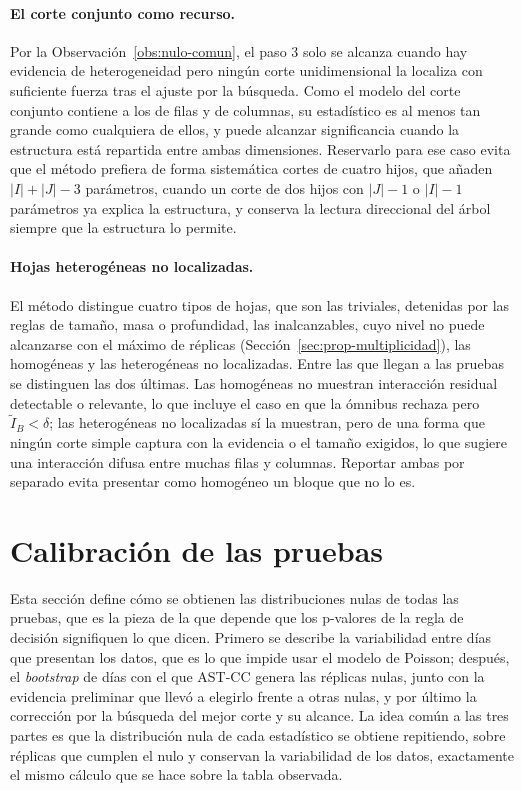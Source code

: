 \paragraph{El corte conjunto como recurso.} Por la
Observación~\ref{obs:nulo-comun}, el paso 3 solo se alcanza cuando hay
evidencia de heterogeneidad pero ningún corte unidimensional la localiza con
suficiente fuerza tras el ajuste por la búsqueda. Como el modelo del corte
conjunto contiene a los de filas y de columnas, su estadístico es al menos tan
grande como cualquiera de ellos, y puede alcanzar significancia cuando la
estructura está repartida entre ambas dimensiones. Reservarlo para ese caso
evita que el método prefiera de forma sistemática cortes de cuatro hijos, que
añaden $|I|+|J|-3$ parámetros, cuando un corte de dos hijos con $|J|-1$ o
$|I|-1$ parámetros ya explica la estructura, y conserva la lectura direccional
del árbol siempre que la estructura lo permite.

\paragraph{Hojas heterogéneas no localizadas.} El método distingue cuatro tipos
de hojas, que son las triviales, detenidas por las reglas de tamaño, masa o
profundidad, las inalcanzables, cuyo nivel no puede alcanzarse con el máximo de
réplicas (Sección~\ref{sec:prop-multiplicidad}), las homogéneas y las
heterogéneas no localizadas. Entre las que llegan a las pruebas se distinguen
las dos últimas. Las homogéneas no muestran interacción residual detectable o
relevante, lo que incluye el caso en que la ómnibus rechaza pero
$\tilde I_B<\delta$; las heterogéneas no localizadas sí la muestran, pero de una
forma que ningún corte simple captura con la evidencia o el tamaño exigidos, lo
que sugiere una interacción difusa entre muchas filas y columnas. Reportar ambas
por separado evita presentar como homogéneo un bloque que no lo es.

\section{Calibración de las pruebas}\label{sec:prop-calibracion}

Esta sección define cómo se obtienen las distribuciones nulas de todas las
pruebas, que es la pieza de la que depende que los p-valores de la regla de
decisión signifiquen lo que dicen. Primero se describe la variabilidad entre
días que presentan los datos, que es lo que impide usar el modelo de Poisson;
después, el \emph{bootstrap} de días con el que AST-CC genera las réplicas
nulas, junto con la evidencia preliminar que llevó a elegirlo frente a otras
nulas, y por último la corrección por la búsqueda del mejor corte y su alcance.
La idea común a las tres partes es que la distribución nula de cada estadístico
se obtiene repitiendo, sobre réplicas que cumplen el nulo y conservan la
variabilidad de los datos, exactamente el mismo cálculo que se hace sobre la
tabla observada.

